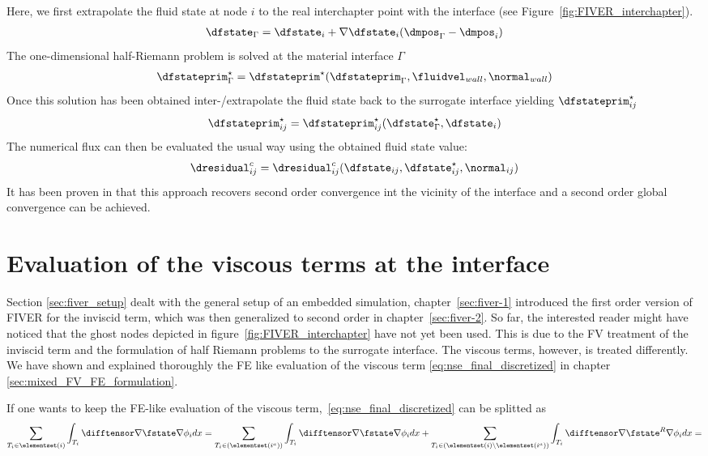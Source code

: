 \documentclass[../main.tex]{subfiles}
\begin{document}
Here, we first extrapolate the fluid state at node $i$ to the real interchapter point with the interface (see Figure~\ref{fig:FIVER_interchapter}).
\begin{align}
\dfstate_{\Gamma} = \dfstate_i + \nabla \dfstate_i(\dmpos_{\Gamma}-\dmpos_i)
\end{align}
The one-dimensional half-Riemann problem is solved at the material interface $\Gamma$
\begin{align}
\dfstateprim^{\star}_{\Gamma} = \dfstateprim^{\star}(\dfstateprim_\Gamma,\fluidvel_{wall},\normal_{wall})
\end{align}
Once this solution has been obtained inter-/extrapolate the fluid state back to the surrogate interface yielding $\dfstateprim^{\star}_{ij}$
\begin{align}
\dfstateprim^{\star}_{ij} = \dfstateprim^{\star}_{ij}(\dfstate^{\star}_\Gamma,\dfstate_i) 
\end{align}
The numerical flux can then be evaluated the usual way using the obtained fluid state value:
\begin{align}
\dresidual^c_{ij} = \dresidual^c_{ij}(\dfstate_{ij},\dfstate^{\star}_{ij}, \normal_{ij})
\end{align}
It has been proven in \cite{Main2014} that this approach recovers second order convergence int the vicinity of the interface and a second order global convergence can be achieved.


\section{Evaluation of the viscous terms at the interface}\label{sec:fiver_viscous_term}
Section \ref{sec:fiver_setup} dealt with the general setup of an embedded simulation, chapter~\ref{sec:fiver-1} introduced the first order version of \ac{FIVER} for the inviscid term, which was then generalized to second order in chapter~\ref{sec:fiver-2}. So far, the interested reader might have noticed that the ghost nodes depicted in figure~\ref{fig:FIVER_interchapter} have not yet been used. This is due to the \ac{FV} treatment of the inviscid term and the formulation of half Riemann problems to the surrogate interface. The viscous terms, however, is treated differently.\\
We have shown and explained thoroughly the \ac{FE} like evaluation of the viscous term \eqref{eq:nse_final_discretized}  in chapter \ref{sec:mixed_FV_FE_formulation}.


If one wants to keep the \ac{FE}-like evaluation of the viscous term,~\eqref{eq:nse_final_discretized} can be splitted as
\begin{align}\label{eq:fiver_viscous_split}
\sum_{T_i \in \elementset(i)} \int_{T_i} \difftensor \nabla \fstate \nabla \phi_i dx=
\sum_{T_i \in \left(\elementset(i^a)\right)} \int_{T_i} \difftensor \nabla \fstate \nabla \phi_i dx+
\sum_{T_i \in \left(\elementset(i)\setminus\elementset(i^a)\right)} \int_{T_i} \difftensor \nabla \fstate^R \nabla \phi_i dx=
\end{align}
\end{document}
